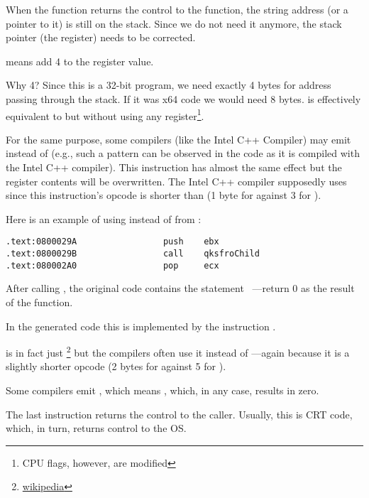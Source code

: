 When the \printf function returns the control to the \main function, the string address (or a pointer to it) is still on the stack.
Since we do not need it anymore, the \gls{stack pointer} (the \ESP register) needs to be corrected.

 means add 4 to the \ESP register value.

Why 4? Since this is a 32-bit program, we need exactly 4 bytes for address passing through the stack. If it was x64 code we would need 8 bytes.
 is effectively equivalent to  but without using any register\footnote{CPU flags, however, are modified}.

\myindex{\oracle}

For the same purpose, some compilers (like the Intel C++ Compiler) may emit  
instead of \ADD (e.g., such a pattern can be observed in the \oracle{} code as it is compiled with the Intel C++ compiler).
This instruction has almost the same effect but the \ECX register contents will be overwritten.
The Intel C++ compiler supposedly uses  since this instruction's opcode is shorter than  (1 byte for  against 3 for ).

Here is an example of using \POP instead of \ADD from \oracle{}:

\begin{lstlisting}[caption=\oracle 10.2 Linux (app.o file)]
.text:0800029A                 push    ebx
.text:0800029B                 call    qksfroChild
.text:080002A0                 pop     ecx
\end{lstlisting}

After calling \printf, the original \CCpp code contains the statement ~---return 0 as the result of the \main function.

In the generated code this is implemented by the instruction .


\XOR is in fact just \footnote{\href{http://go.yurichev.com/17118}{wikipedia}} but the compilers often use it instead of
---again because it is a slightly shorter opcode (2 bytes for \XOR against 5 for \MOV).

Some compilers emit , which means  \EAX {} \EAX, which, in any case, results in zero.

The last instruction \RET returns the control to the \gls{caller}. Usually, this is \CCpp \ac{CRT} code, which, in turn, returns control to the \ac{OS}.

